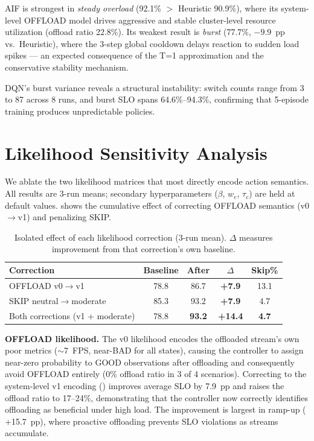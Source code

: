 \documentclass[conference]{IEEEtran}
\begin{document}
AIF is strongest in \emph{steady overload} (92.1\% $>$ Heuristic 90.9\%), where its system-level OFFLOAD model drives aggressive and stable cluster-level resource utilization (offload ratio 22.8\%).
Its weakest result is \emph{burst} (77.7\%, $-9.9$~pp vs.\ Heuristic), where the 3-step global cooldown delays reaction to sudden load spikes — an expected consequence of the T=1 approximation and the conservative stability mechanism.

DQN's burst variance reveals a structural instability: switch counts range from 3 to 87 across 8 runs, and burst SLO spans 64.6\%--94.3\%, confirming that 5-episode training produces unpredictable policies.

\section{Likelihood Sensitivity Analysis}
\label{sec:ablation}

We ablate the two likelihood matrices that most directly encode action semantics.
All results are 3-run means; secondary hyperparameters ($\beta$, $w_e$, $\tau_c$) are held at default values.
 shows the cumulative effect of correcting OFFLOAD semantics (v0$\to$v1) and penalizing SKIP.

\begin{table}[t]
    \centering
    \caption{Isolated effect of each likelihood correction (3-run mean). $\Delta$ measures improvement from that correction's own baseline.}
    \label{tab:likelihood_ablation}
    \small
    \begin{tabular}{@{}lcccc@{}}
        \toprule
        Correction & Baseline & After & $\Delta$ & Skip\% \\
        \midrule
        OFFLOAD v0$\to$v1 & 78.8 & 86.7 & \textbf{+7.9} & 13.1 \\
        SKIP neutral$\to$moderate & 85.3 & 93.2 & \textbf{+7.9} & 4.7 \\
        \midrule
        Both corrections (v1 + moderate) & 78.8 & \textbf{93.2} & \textbf{+14.4} & \textbf{4.7} \\
        \bottomrule
    \end{tabular}
\end{table}

\textbf{OFFLOAD likelihood.}
The v0 likelihood encodes the offloaded stream's own poor metrics ($\sim$7~FPS, near-BAD for all states), causing the controller to assign near-zero probability to GOOD observations after offloading and consequently avoid OFFLOAD entirely (0\% offload ratio in 3 of 4 scenarios).
Correcting to the system-level v1 encoding () improves average SLO by 7.9~pp and raises the offload ratio to 17--24\%, demonstrating that the controller now correctly identifies offloading as beneficial under high load.
The improvement is largest in ramp-up ($+$15.7~pp), where proactive offloading prevents SLO violations as streams accumulate.
\end{document}
